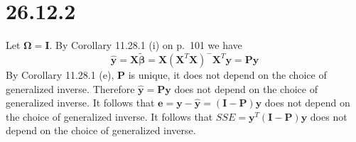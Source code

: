 \section*{26.12.2}
Let $\bm\Omega=\mathbf I$.
By Corollary 11.28.1 (i) on p.\ 101 we have
$$\mathbf{\hat y}=
\mathbf X\bm{\tilde\beta}=\mathbf X(\mathbf X^T
\mathbf X)^{-{}}\mathbf X^T\mathbf y=\mathbf{Py}$$
By Corollary 11.28.1 (e), $\mathbf P$ is unique, it does not
depend on the choice of generalized inverse.
Therefore $\mathbf{\hat y}=\mathbf{Py}$ does not depend on the choice of
generalized inverse.
It follows that $\mathbf e=\mathbf y-\mathbf{\hat y}
=(\mathbf I-\mathbf P)\mathbf y$ does not
depend on the choice of generalized inverse.
It follows that $SSE=\mathbf y^T(\mathbf I-\mathbf P)\mathbf y$ does not depend on the
choice of generalized inverse.
